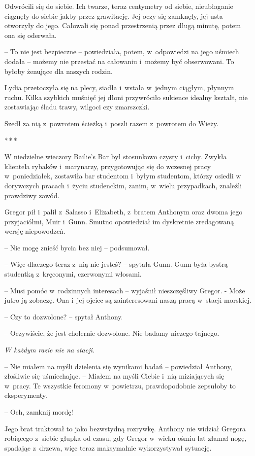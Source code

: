 \documentclass[oneside,polish,12pt,sfheadings]{mwbk}
\newcommand{\threeast}{\bigskip\par\centerline{*\,*\,*}\medskip\par}%
\begin{document}
Odwrócili się do siebie. Ich twarze, teraz centymetry od siebie,
nieubłaganie ciągnęły do siebie jakby przez grawitację. Jej oczy się
zamknęły, jej usta otworzyły do jego. Całowali się ponad przestrzenią
przez długą minutę, potem ona się oderwała.

-- To nie jest bezpieczne -- powiedziała, potem, w~odpowiedzi na jego
uśmiech dodała -- możemy nie przestać na całowaniu i~możemy być
obserwowani. To byłoby żenujące dla naszych rodzin.

Lydia przetoczyła się na plecy, siadła i~wstała w~jednym ciągłym,
płynnym ruchu. Kilka szybkich muśnięć jej dłoni przywróciło sukience
idealny kształt, nie zostawiając śladu trawy, wilgoci czy zmarszczki.

Szedł za nią z~powrotem ścieżką i~poszli razem z~powrotem do Wieży.

\threeast

W niedzielne wieczory Bailie's Bar był stosunkowo czysty i~cichy. Zwykła
klientela rybaków i~marynarzy, przygotowując się do wczesnej pracy w~poniedziałek, zostawiła bar studentom i~byłym studentom, którzy osiedli
w dorywczych pracach i~życiu studenckim, zanim, w~wielu przypadkach,
znaleźli prawdziwy zawód.

Gregor pił i~palił z~Salasso i~Elizabeth, z~bratem Anthonym oraz dwoma
jego przyjaciółmi, Muir i~Gunn. Smutno opowiedział im dyskretnie
zredagowaną wersję niepowodzeń.

-- Nie mogę znieść bycia bez niej -- podsumował.

-- Więc dlaczego teraz z~nią nie jesteś? -- spytała Gunn. Gunn była bystrą
studentką z~kręconymi, czerwonymi włosami.

-- Musi pomóc w~rodzinnych interesach -- wyjaśnił nieszczęśliwy Gregor. -
Może jutro ją zobaczę. Ona i~jej ojciec są zainteresowani naszą pracą w~stacji morskiej.

-- Czy to dozwolone? -- spytał Anthony.

-- Oczywiście, że jest cholernie dozwolone. Nie badamy niczego tajnego.

\emph{W każdym razie nie na stacji.}

-- Nie miałem na myśli dzielenia się wynikami badań -- powiedział
Anthony, złośliwie się uśmiechając. -- Miałem na myśli Ciebie i~nią
miziających się w~pracy. Te wszystkie feromony w~powietrzu,
prawdopodobnie zepsułoby to eksperymenty.

-- Och, zamknij mordę!

Jego brat traktował to jako bezwstydną rozrywkę. Anthony nie widział
Gregora robiącego z~siebie głupka od czasu, gdy Gregor w~wieku ośmiu lat
złamał nogę, spadając z~drzewa, więc teraz maksymalnie wykorzystywał sytuację.
\end{document}
